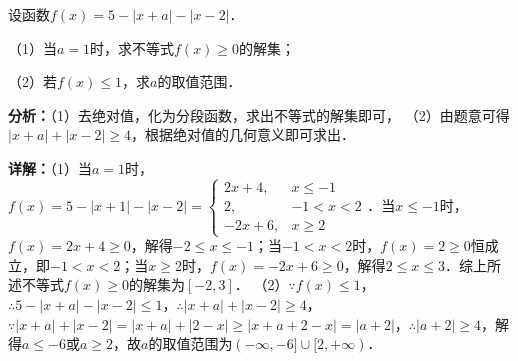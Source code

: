 \begin{question}[points=10]
[选修4-5：不等式选讲]

设函数$f(x)=5-|x+a|-|x-2|$．

（1）当$a=1$时，求不等式$f(x)\ge 0$的解集；

（2）若$f(x)\le 1$，求$a$的取值范围．
\begin{solution}

\textbf{分析：}（1）去绝对值，化为分段函数，求出不等式的解集即可，
（2）由题意可得$|x+a|+|x-2|\ge 4$，根据绝对值的几何意义即可求出．

\textbf{详解：}（1）当$a=1$时，$f(x)=5-|x+1|-|x-2|=\begin{cases} 2x+4, & x\le -1 \\ 2, & -1<x<2 \\ -2x+6, & x\ge 2 \end{cases}$．当$x\le -1$时，$f(x)=2x+4\ge0$，解得$-2\le x\le -1$；当$-1<x<2$时，$f(x)=2\ge0$恒成立，即$-1<x<2$；当$x\ge2$时，$f(x)=-2x+6\ge0$，解得$2\le x\le 3$．综上所述不等式$f(x)\ge0$的解集为$[-2,3]$．
（2）$\because f(x)\le1$，$\therefore5-|x+a|-|x-2|\le1$，$\therefore|x+a|+|x-2|\ge4$，$\because|x+a|+|x-2|=|x+a|+|2-x|\ge|x+a+2-x|=|a+2|$，$\therefore|a+2|\ge4$，解得$a\le -6$或$a\ge2$，故$a$的取值范围为$(-\infty,-6]\cup[2,+\infty)$．
\end{solution}
\end{question}

